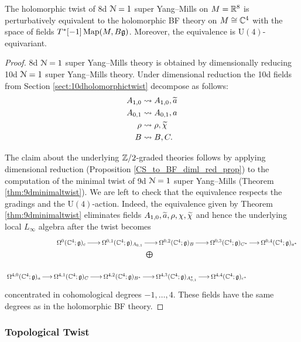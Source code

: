 \documentclass[10pt, oneside]{article}
\renewcommand{\U}{\mathrm{U}}
\begin{document}
\begin{theorem}
The holomorphic twist of 8d $\mathcal N=1$ super Yang--Mills on $M=\mathbb R^8$ is perturbatively equivalent to the holomorphic BF theory on $M\cong\mathbb C^4$ with the space of fields $T^*[-1]\operatorname{Map}(M, B\mathfrak g)$. Moreover, the equivalence is $\U(4)$-equivariant.
\label{thm:8dholomorphictwist}
\end{theorem}
\begin{proof}
8d $\mathcal N=1$ super Yang--Mills theory is obtained by dimensionally reducing 10d $\mathcal N=1$ super Yang--Mills theory. Under dimensional reduction the 10d fields from Section \ref{sect:10dholomorphictwist} decompose as follows:
\begin{align*}
A_{1, 0}&\rightsquigarrow A_{1, 0}, \widetilde{a} \\
A_{0, 1}&\rightsquigarrow A_{0, 1}, a \\
\rho&\rightsquigarrow \rho, \widetilde{\chi} \\
B&\rightsquigarrow B, C.
\end{align*}

The claim about the underlying $\mathbb Z/2$-graded theories follows by applying dimensional reduction (Proposition \ref{CS_to_BF_diml_red_prop}) to the computation of the minimal twist of 9d $\mathcal N=1$ super Yang--Mills (Theorem \ref{thm:9dminimaltwist}). We are left to check that the equivalence respects  the gradings and the $\U(4)$-action. Indeed, the equivalence given by Theorem \ref{thm:9dminimaltwist} eliminates fields $A_{1, 0}, \widetilde{a}, \rho, \chi, \widetilde{\chi}$ and hence the underlying local $L_\infty$ algebra after the twist becomes
\[
\xymatrix@R=0.5cm@C=0.5cm{
&\Omega^0(\CC^4; \gg)_c \ar[r] &\Omega^{0,1}(\CC^4; \gg)_{A_{0,1}} \ar[r] &\Omega^{0,2}(\CC^4; \gg)_{B} \ar[r] &\Omega^{0,3}(\CC^4; \gg)_{C^*} \ar[r] &\Omega^{0,4}(\CC^4; \gg)_{a^*} \\
&&\ar@{}^{\bigoplus}[r] &&& \\
\Omega^{4,0}(\CC^4; \gg)_{a} \ar[r] &\Omega^{4,1}(\CC^4; \gg)_C \ar[r] &\Omega^{4,2}(\CC^4; \gg)_{B^*} \ar[r] &\Omega^{4,3}(\CC^4; \gg)_{A_{0,1}^*} \ar[r] &\Omega^{4,4}(\CC^4; \gg)_{c^*}&
}
\]
concentrated in cohomological degrees $-1, \dots, 4$. These fields have the same degrees as in the holomorphic BF theory.
\end{proof}

\subsubsection{Topological Twist}
\label{sect:8dtopologicaltwist}
\end{document}
